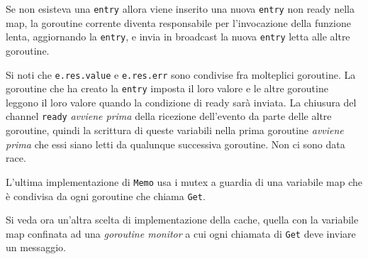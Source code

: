 \documentclass[../../thesis.tex]{subfiles}
\begin{document}
    Se non esisteva una \verb"entry" allora viene inserito una nuova \verb"entry" non ready nella map, la goroutine corrente diventa responsabile per l'invocazione della funzione lenta, aggiornando la \verb"entry", e invia in broadcast la nuova \verb"entry" letta alle altre goroutine.
    \hfill \vspace{12pt}

    Si noti che \verb"e.res.value" e \verb"e.res.err" sono condivise fra molteplici goroutine.
    La goroutine che ha creato la \verb"entry" imposta il loro valore e le altre goroutine leggono il loro valore quando la condizione di ready sarà inviata.
    La chiusura del channel \verb"ready" \textit{avviene prima} della ricezione dell'evento da parte delle altre goroutine, quindi la scrittura di queste variabili nella prima goroutine \textit{avviene prima} che essi siano letti da qualunque successiva goroutine.
    Non ci sono data race.
    \hfill \vspace{12pt}

    L'ultima implementazione di \verb"Memo" usa i mutex a guardia di una variabile map che è condivisa da ogni goroutine che chiama \verb"Get".
    \hfill \vspace{12pt}

    Si veda ora un'altra scelta di implementazione della cache, quella con la variabile map confinata ad una \textit{goroutine monitor} a cui ogni chiamata di \verb"Get" deve inviare un messaggio.
    \hfill \vspace{12pt}
\end{document}
